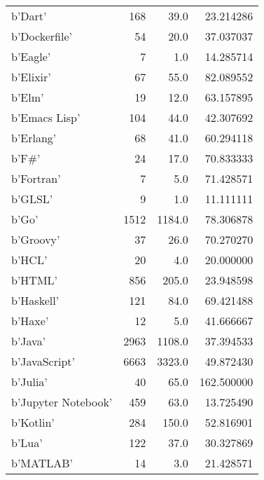 \begin{table}
\begin{tabular}{|l|r|r|r|}
b'Dart'             &                   168 &      39.0 &      23.214286 \\
b'Dockerfile'       &                    54 &      20.0 &      37.037037 \\
b'Eagle'            &                     7 &       1.0 &      14.285714 \\
b'Elixir'           &                    67 &      55.0 &      82.089552 \\
b'Elm'              &                    19 &      12.0 &      63.157895 \\
b'Emacs Lisp'       &                   104 &      44.0 &      42.307692 \\
b'Erlang'           &                    68 &      41.0 &      60.294118 \\
b'F\#'               &                    24 &      17.0 &      70.833333 \\
b'Fortran'          &                     7 &       5.0 &      71.428571 \\
b'GLSL'             &                     9 &       1.0 &      11.111111 \\
b'Go'               &                  1512 &    1184.0 &      78.306878 \\
b'Groovy'           &                    37 &      26.0 &      70.270270 \\
b'HCL'              &                    20 &       4.0 &      20.000000 \\
b'HTML'             &                   856 &     205.0 &      23.948598 \\
b'Haskell'          &                   121 &      84.0 &      69.421488 \\
b'Haxe'             &                    12 &       5.0 &      41.666667 \\
b'Java'             &                  2963 &    1108.0 &      37.394533 \\
b'JavaScript'       &                  6663 &    3323.0 &      49.872430 \\
b'Julia'            &                    40 &      65.0 &     162.500000 \\
b'Jupyter Notebook' &                   459 &      63.0 &      13.725490 \\
b'Kotlin'           &                   284 &     150.0 &      52.816901 \\
b'Lua'              &                   122 &      37.0 &      30.327869 \\
b'MATLAB'           &                    14 &       3.0 &      21.428571 \\

\end{tabular}
\end{table}
